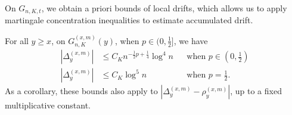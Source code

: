 \documentclass[EJP]{ejpecp} %
\begin{document}
On $G_{n, K, t}$, we obtain a priori bounds of local drifts, which allows us to apply martingale concentration inequalities to estimate accumulated drift.
\begin{lemma}\label{lm:lipchitz-bound-on-good-event}
	For all  $y \ge x$, on $G_{n, K}^{(x,m)}(y)$, when $p \in (0,\frac{1}{2}]$,  we have
	\begin{align*}
		\left| \Delta_y^{(x,m)} \right| &\le C_K n^{-\frac{1}{2}p + \frac{1}{4}} \log^4 n &&\text{when }p \in \left(0,\frac{1}{2}\right)\\
		\left| \Delta_y^{(x,m)} \right| &\le C_K \log^5 n &&\text{when }p = \frac{1}{2}
		.\end{align*}
	As a corollary, these bounds also apply to $\left| \Delta_y^{(x,m)} - \rho_y^{(x,m)} \right| $, up to a fixed multiplicative constant.
\end{lemma}
\end{document}
